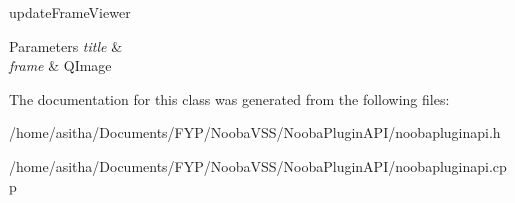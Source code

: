 update\-Frame\-Viewer 


\begin{DoxyParams}{Parameters}
{\em title} & \\
\hline
{\em frame} & Q\-Image \\
\hline
\end{DoxyParams}


The documentation for this class was generated from the following files\-:\begin{DoxyCompactItemize}
\item 
/home/asitha/\-Documents/\-F\-Y\-P/\-Nooba\-V\-S\-S/\-Nooba\-Plugin\-A\-P\-I/noobapluginapi.\-h\item 
/home/asitha/\-Documents/\-F\-Y\-P/\-Nooba\-V\-S\-S/\-Nooba\-Plugin\-A\-P\-I/noobapluginapi.\-cpp\end{DoxyCompactItemize}
